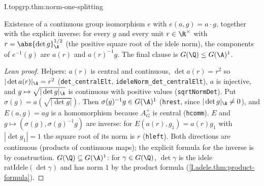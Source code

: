 \begin{theorem}[$G(\A)=\AGplus\times G(\A)^1$]
\end{theorem}
\begin{tfformal}{I.topgrp.thm:norm-one-splitting}
\begin{tffidelity}
Existence of a continuous group isomorphism $e$ with $e(a,g)=a\cdot g$, together with the explicit inverse: for every $g$ and every unit $r\in\R^\times$ with $r=\abs{\det g}_\A^{1/2}$ (the positive square root of the idele norm), the components of $e^{-1}(g)$ are $a(r)$ and $a(r)^{-1}g$. The final clause is $G(\Q)\le G(\A)^1$.
\end{tffidelity}
\end{tfformal}
\begin{proof}[Lean proof]
Helpers: $a(r)$ is central and continuous, $\det a(r)=r^2$ so $|\det a(r)|_\A=r^2$ (\texttt{det\_centralElt}, \texttt{ideleNorm\_det\_centralElt}), $a$ is injective, and $g\mapsto\sqrt{|\det g|_\A}$ is continuous with positive values (\texttt{sqrtNormDet}). Put $\sigma(g)=a(\sqrt{|\det g|})$. Then $\sigma(g)^{-1}g\in G(\A)^1$ (\texttt{hrest}, since $|\det g|_\A\neq 0$), and $E(a,g)=ag$ is a homomorphism because $A_G^+$ is central (\texttt{hcomm}). $E$ and $g\mapsto(\sigma(g),\sigma(g)^{-1}g)$ are inverse: for $E(a(r),g_1)=a(r)g_1$ with $|\det g_1|=1$ the square root of its norm is $r$ (\texttt{hleft}). Both directions are continuous (products of continuous maps); the explicit formula for the inverse is by construction. $G(\Q)\subseteq G(\A)^1$: for $\gamma\in G(\Q)$, $\det\gamma$ is the idele $\mathrm{ratIdele}(\det\gamma)$ and has norm $1$ by the product formula (\cref{I.adele.thm:product-formula}).
\end{proof}


